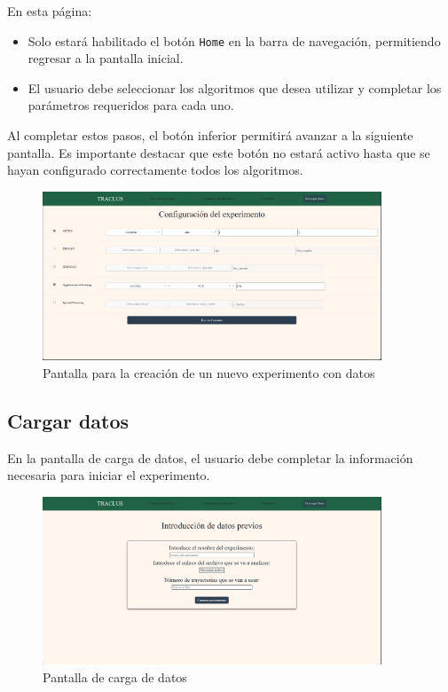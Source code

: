 En esta página:

\begin{itemize}
    \item Solo estará habilitado el botón \texttt{Home} en la barra de navegación, permitiendo regresar a la pantalla inicial.
    \item El usuario debe seleccionar los algoritmos que desea utilizar y completar los parámetros requeridos para cada uno.
\end{itemize}

Al completar estos pasos, el botón inferior permitirá avanzar a la siguiente pantalla. Es importante destacar que este botón no estará activo hasta que se hayan configurado correctamente todos los algoritmos.

\begin{figure}[H]
    \centering
    \includegraphics[width=0.9\textwidth]{img/expirement_page_complete.png}
    \caption{Pantalla para la creación de un nuevo experimento con datos}
\end{figure}

\subsection{Cargar datos}

En la pantalla de carga de datos, el usuario debe completar la información necesaria para iniciar el experimento.

\begin{figure}[H]
    \centering
    \includegraphics[width=0.9\textwidth]{img/load_page.png}
    \caption{Pantalla de carga de datos}
\end{figure}

